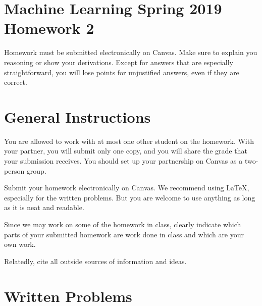 \documentclass[10pt]{article}
\begin{document}
\section*{Machine Learning Spring 2019 Homework 2}

Homework must be submitted electronically on Canvas. Make sure to explain you reasoning or show your derivations. Except for answers that are especially straightforward, you will lose points for unjustified answers, even if they are correct. 

\section*{General Instructions}

You are allowed to work with at most one other student on the homework. With your partner, you will submit only one copy, and you will share the grade that your submission receives. You should set up your partnership on Canvas as a two-person group. 

Submit your homework electronically on Canvas. We recommend using LaTeX, especially for the written problems. But you are welcome to use anything as long as it is neat and readable. 

Since we may work on some of the homework in class, clearly indicate which parts of your submitted homework are work done in class and which are your own work. 

Relatedly, cite all outside sources of information and ideas. 

\section*{Written Problems}
\end{document}
